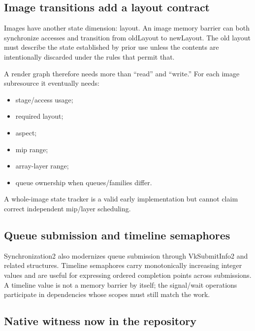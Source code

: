 \subsection{Image transitions add a layout contract}\label{appendix-f15ce0d9c170-image-transitions-add-a-layout-contract}

Images have another state dimension: layout. An image memory barrier can both synchronize accesses and transition from oldLayout to newLayout. The old layout must describe the state established by prior use unless the contents are intentionally discarded under the rules that permit that.

A render graph therefore needs more than ``read'' and ``write.'' For each image subresource it eventually needs:

\begin{itemize}
\tightlist
\item
  stage/access usage;
\item
  required layout;
\item
  aspect;
\item
  mip range;
\item
  array-layer range;
\item
  queue ownership when queues/families differ.
\end{itemize}

A whole-image state tracker is a valid early implementation but cannot claim correct independent mip/layer scheduling.

\subsection{Queue submission and timeline semaphores}\label{appendix-f15ce0d9c170-queue-submission-and-timeline-semaphores}

Synchronization2 also modernizes queue submission through VkSubmitInfo2 and related structures. Timeline semaphores carry monotonically increasing integer values and are useful for expressing ordered completion points across submissions. A timeline value is not a memory barrier by itself; the signal/wait operations participate in dependencies whose scopes must still match the work.

\subsection{Native witness now in the repository}\label{appendix-f15ce0d9c170-native-witness-now-in-the-repository}

